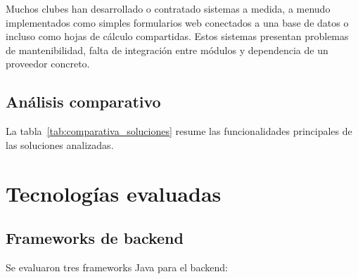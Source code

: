 Muchos clubes han desarrollado o contratado sistemas a medida, a menudo
implementados como simples formularios web conectados a una base de datos o
incluso como hojas de cálculo compartidas. Estos sistemas presentan problemas
de mantenibilidad, falta de integración entre módulos y dependencia de un
proveedor concreto.

\subsection{Análisis comparativo}

La tabla~\ref{tab:comparativa_soluciones} resume las funcionalidades principales
de las soluciones analizadas.

\begin{table}[ht]
\centering
{}
\caption{Comparativa de soluciones existentes.}
\label{tab:comparativa_soluciones}
\end{table}

\section{Tecnologías evaluadas}
\label{sec:tecnologias_evaluadas}

\subsection{Frameworks de backend}

Se evaluaron tres frameworks Java para el backend:

